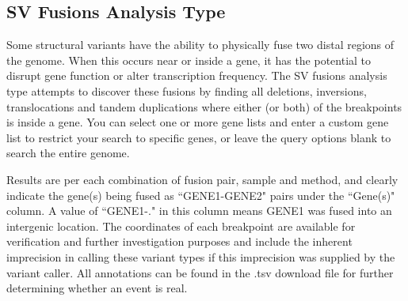 \documentclass[11pt, a4paper]{article}
\begin{document}
\subsection{SV Fusions Analysis Type}

Some structural variants have the ability to physically fuse two distal regions of the genome. When this occurs near or inside a gene, it has the potential to disrupt gene function or alter transcription frequency. The SV fusions analysis type attempts to discover these fusions by finding all deletions, inversions, translocations and tandem duplications where either (or both) of the breakpoints is inside a gene. You can select one or more gene lists and enter a custom gene list to restrict your search to specific genes, or leave the query options blank to search the entire genome.

Results are per each combination of fusion pair, sample and method, and clearly indicate the gene(s) being fused as ``GENE1-GENE2" pairs under the ``Gene(s)" column. A value of ``GENE1-." in this column means GENE1 was fused into an intergenic location. The coordinates of each breakpoint are available for verification and further investigation purposes and include the inherent imprecision in calling these variant types if this imprecision was supplied by the variant caller. All annotations can be found in the .tsv download file for further determining whether an event is real.

\end{document}
